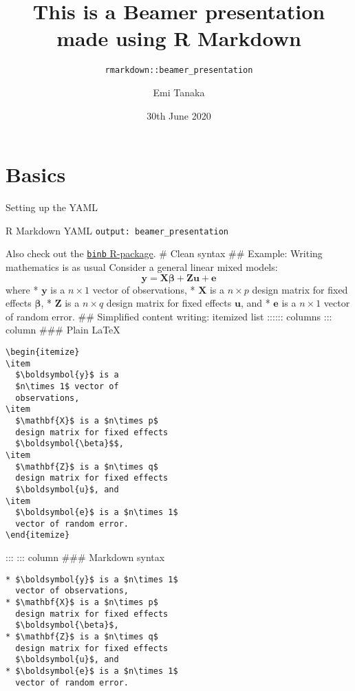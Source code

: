 \documentclass[
  10pt,
  ignorenonframetext,
  aspectratio=169,
]{beamer}
\title{This is a Beamer presentation made using R Markdown}
\subtitle{\texttt{rmarkdown::beamer\_presentation}}
\author{Emi Tanaka}
\date{30th June 2020}
\institute{Monash University}
\begin{document}
\frame{\titlepage}

\begin{frame}[allowframebreaks]
  \tableofcontents[hideallsubsections]
\end{frame}
\hypertarget{basics}{%
\section{Basics}\label{basics}}

\begin{frame}[fragile]{Setting up the YAML}
\protect\hypertarget{setting-up-the-yaml}{}
\begin{block}{R Markdown YAML}
\protect\hypertarget{r-markdown-yaml}{}
\texttt{output:\ beamer\_presentation}
\end{block}

Also check out the
\href{https://github.com/eddelbuettel/binb}{\texttt{binb} R-package}. \#
Clean syntax \#\# Example: Writing mathematics is as usual Consider a
general linear mixed models:
\[\boldsymbol{y} = \mathbf{X}\boldsymbol{\beta} + \mathbf{Z}\boldsymbol{u} + \boldsymbol{e}\]
where * \(\boldsymbol{y}\) is a \(n\times 1\) vector of observations, *
\(\mathbf{X}\) is a \(n\times p\) design matrix for fixed effects
\(\boldsymbol{\beta}\), * \(\mathbf{Z}\) is a \(n\times q\) design
matrix for fixed effects \(\boldsymbol{u}\), and * \(\boldsymbol{e}\) is
a \(n\times 1\) vector of random error. \#\# Simplified content writing:
itemized list :::::: columns ::: column \#\#\# Plain \LaTeX \small  

\begin{verbatim}
\begin{itemize}
\item 
  $\boldsymbol{y}$ is a 
  $n\times 1$ vector of 
  observations,
\item
  $\mathbf{X}$ is a $n\times p$ 
  design matrix for fixed effects
  $\boldsymbol{\beta}$$,
\item
  $\mathbf{Z}$ is a $n\times q$ 
  design matrix for fixed effects
  $\boldsymbol{u}$, and
\item
  $\boldsymbol{e}$ is a $n\times 1$ 
  vector of random error.
\end{itemize}
\end{verbatim}

::: ::: column \#\#\# Markdown syntax \small   \vspace{0.5cm}

\begin{verbatim}
* $\boldsymbol{y}$ is a $n\times 1$ 
  vector of observations,
* $\mathbf{X}$ is a $n\times p$ 
  design matrix for fixed effects 
  $\boldsymbol{\beta}$,
* $\mathbf{Z}$ is a $n\times q$ 
  design matrix for fixed effects 
  $\boldsymbol{u}$, and
* $\boldsymbol{e}$ is a $n\times 1$ 
  vector of random error.
\end{verbatim}


\end{frame}
\end{document}
